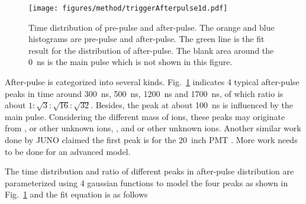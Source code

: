 \begin{figure}[!htbp]
    \centering
    \texttt{[image: figures/method/triggerAfterpulse1d.pdf]}
    \caption{Time distribution of pre-pulse and after-pulse. The orange and blue histograms are pre-pulse and after-pulse. The green line is the fit result for the distribution of after-pulse. The blank area around the \SI{0}{ns} is the main pulse which is not shown in this figure.}
    \label{fig:afterpulse1d}
\end{figure}

After-pulse is categorized into several kinds. Fig.~\ref{fig:afterpulse1d} indicates 4 typical after-pulse peaks in time around \SI{300}{ns}, \SI{500}{ns}, \SI{1200}{ns} and \SI{1700}{ns}, of which ratio is about $1:\sqrt{3}:\sqrt{16}:\sqrt{32}$. Besides, the peak at about \SI{100}{ns} is influenced by the main pulse. Considering the different mass of ions, these peaks may originate from ,  or other unknown ions, , and  or other unknown ions. Another similar work done by JUNO claimed the first peak is  for the \SI{20}{inch} PMT \cite{Zhao:2022gks}. More work needs to be done for an advanced model.

The time distribution and ratio of different peaks in after-pulse distribution are parameterized using 4 gaussian functions to model the four peaks as shown in Fig.~\ref{fig:afterpulse1d} and the fit equation is as follows

